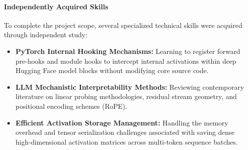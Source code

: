 \documentclass[12 pt]{article}  %
\begin{document}
\paragraph{Independently Acquired Skills}
To complete the project scope, several specialized technical skills were 
acquired through independent study:

\begin{itemize}
    \item \textbf{PyTorch Internal Hooking Mechanisms:} Learning to register 
    forward pre-hooks and module hooks to intercept internal activations within 
    deep Hugging Face model blocks without modifying core source code.
    \item \textbf{LLM Mechanistic Interpretability Methods:} Reviewing 
    contemporary literature on linear probing methodologies, residual stream 
    geometry, and positional encoding schemes (RoPE).
    \item \textbf{Efficient Activation Storage Management:} Handling the memory 
    overhead and tensor serialization challenges associated with saving dense 
    high-dimensional activation matrices across multi-token sequence batches.
\end{itemize}

\cleardoublepage


\end{document}
